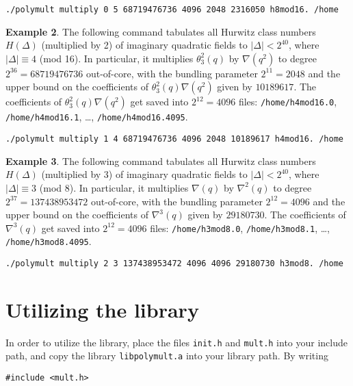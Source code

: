 \documentclass[a4paper,10pt]{article}
\newcommand{\code}{\lstinline}
\begin{document}
\begin{lstlisting}
./polymult multiply 0 5 68719476736 4096 2048 2316050 h8mod16. /home
\end{lstlisting}

\textbf{Example 2}. The following command tabulates all Hurwitz class numbers $H(\Delta)$ (multiplied by 2) of imaginary quadratic fields to $|\Delta| < 2^{40}$, where $|\Delta| \equiv 4$ (mod 16). In particular, it multiplies $\theta_3^2(q)$ by $\nabla(q^2)$ to degree $2^{36}=68719476736$ out-of-core, with the bundling parameter $2^{11}=2048$ and the upper bound on the coefficients of $\theta_3^2(q)\nabla(q^2)$ given by $10189617$. The coefficients of $\theta_3^2(q)\nabla(q^2)$ get saved into $2^{12}=4096$ files: \code{/home/h4mod16.0}, \code{/home/h4mod16.1}, \ldots, \code{/home/h4mod16.4095}.

\begin{lstlisting}
./polymult multiply 1 4 68719476736 4096 2048 10189617 h4mod16. /home
\end{lstlisting}

\textbf{Example 3}. The following command tabulates all Hurwitz class numbers $H(\Delta)$ (multiplied by 3) of imaginary quadratic fields to $|\Delta| < 2^{40}$, where $|\Delta| \equiv 3$ (mod 8). In particular, it multiplies $\nabla(q)$ by $\nabla^2(q)$ to degree $2^{37}=137438953472$ out-of-core, with the bundling parameter $2^{12}=4096$ and the upper bound on the coefficients of $\nabla^3(q)$ given by $29180730$. The coefficients of $\nabla^3(q)$ get saved into $2^{12}=4096$ files: \code{/home/h3mod8.0}, \code{/home/h3mod8.1}, \ldots, \code{/home/h3mod8.4095}.

\begin{lstlisting}
./polymult multiply 2 3 137438953472 4096 4096 29180730 h3mod8. /home
\end{lstlisting}



\section{Utilizing the library} \label{sec:polymult_lib}

In order to utilize the library, place the files \code{init.h} and \code{mult.h} into your include path, and copy the library \code{libpolymult.a} into your library path. By writing

\begin{lstlisting}
#include <mult.h>
\end{lstlisting}
\end{document}
